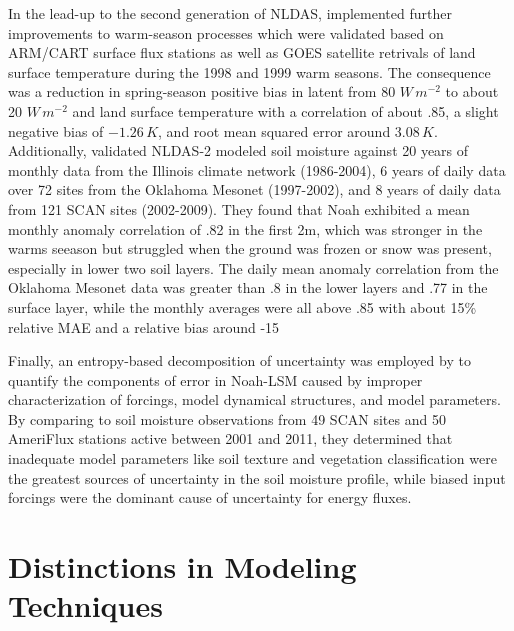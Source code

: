 In the lead-up to the second generation of NLDAS, \parencite{wei_improvement_2011} implemented further improvements to warm-season processes which were validated based on ARM/CART surface flux stations as well as GOES satellite retrivals of land surface temperature during the 1998 and 1999 warm seasons. The consequence was a reduction in spring-season positive bias in latent from 80 $W\,m^{-2}$ to about 20 $W\,m^{-2}$ and land surface temperature with a correlation of about .85, a slight negative bias of $-1.26\,K$, and root mean squared error around $3.08\,K$. Additionally, \parencite{xia_evaluation_2014} validated NLDAS-2 modeled soil moisture against 20 years of monthly data from the Illinois climate network (1986-2004), 6 years of daily data over 72 sites from the Oklahoma Mesonet (1997-2002), and 8 years of daily data from 121 SCAN sites (2002-2009). They found that Noah exhibited a mean monthly anomaly correlation of .82 in the first 2m, which was stronger in the warms seeason but struggled when the ground was frozen or snow was present, especially in lower two soil layers. The daily mean anomaly correlation from the Oklahoma Mesonet data was greater than .8 in the lower layers and .77 in the surface layer, while the monthly averages were all above .85 with about 15\% relative MAE and a relative bias around -15%

Finally, an entropy-based decomposition of uncertainty was employed by \parencite{nearing_benchmarking_2016} to quantify the components of error in Noah-LSM caused by improper characterization of forcings, model dynamical structures, and model parameters. By comparing to soil moisture observations from 49 SCAN sites and 50 AmeriFlux stations active between 2001 and 2011, they determined that inadequate model parameters like soil texture and vegetation classification were the greatest sources of uncertainty in the soil moisture profile, while biased input forcings were the dominant cause of uncertainty for energy fluxes.

\section{Distinctions in Modeling Techniques}

